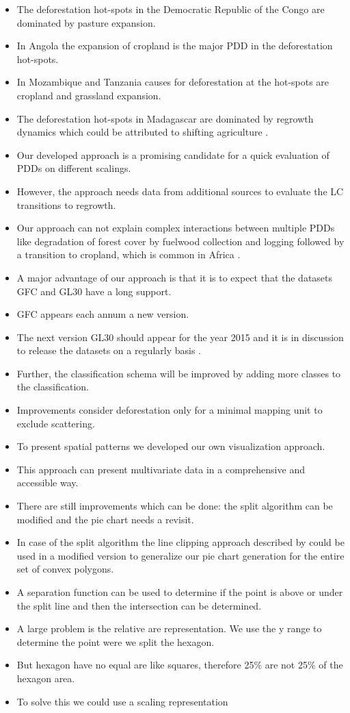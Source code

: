 \begin{itemize}
				\item The deforestation hot-spots in the Democratic Republic of the Congo are dominated by pasture expansion.
				\item In Angola the expansion of cropland is the major \ac{PDD} in the deforestation hot-spots.
				\item In Mozambique and Tanzania causes for deforestation at the hot-spots are cropland and grassland expansion.
				\item The deforestation hot-spots in Madagascar are dominated by regrowth dynamics which could be attributed to shifting agriculture \citep{Curtis2018}.
				\item Our developed approach is a promising candidate for a quick evaluation of \acp{PDD} on different scalings.
				\item However, the approach needs data from additional sources to evaluate the \ac{LC} transitions to regrowth.
				\item Our approach can not explain complex interactions between multiple \acp{PDD} like degradation of forest cover by fuelwood collection and logging followed by a transition to cropland, which is common in Africa \citep{Geist2001,Cabral2011}.
				\item A major advantage of our approach is that it is to expect that the datasets \ac{GFC} and \ac{GL30} have a long support.
				\item \ac{GFC} appears each annum a new version.
				\item The next version \ac{GL30} should appear for the year 2015 and it is in discussion to release the datasets on a regularly basis \citep{Chen2017}.
				\item Further, the classification schema will be improved by adding more classes to the classification.
				\item Improvements consider deforestation only for a minimal mapping unit to exclude scattering.
				\item To present spatial patterns we developed our own visualization approach.
				\item This approach can present multivariate data in a comprehensive and accessible way.
				\item There are still improvements which can be done: the split algorithm can be modified and the pie chart needs a revisit.
				\item In case of the split algorithm the line clipping approach described by \citep{Skala1994} could be used in a modified version to generalize our pie chart generation for the entire set of convex polygons.
				\item A separation function can be used to determine if the point is above or under the split line and then the intersection can be determined.
				\item A large problem is the relative are representation. We use the y range to determine the point were we split the hexagon.
				\item But hexagon have no equal are like squares, therefore 25\% are not 25\% of the hexagon area.
				\item To solve this we could use a scaling representation
			\end{itemize}

